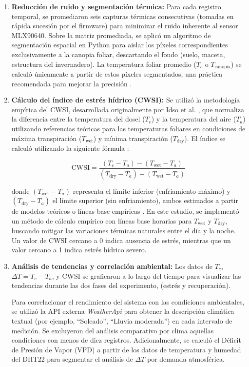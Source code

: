 \begin{enumerate}
    \item \textbf{Reducción de ruido y segmentación térmica:} 
    Para cada registro temporal, se promediaron seis capturas térmicas consecutivas (tomadas en rápida sucesión por el firmware) para minimizar el ruido inherente al sensor MLX90640. 
    Sobre la matriz promediada, se aplicó un algoritmo de segmentación espacial en Python para aislar los píxeles correspondientes exclusivamente a la canopia foliar, descartando el fondo (suelo, maceta, estructura del invernadero). 
    La temperatura foliar promedio ($T_c$ o $T_{\text{canopia}}$) se calculó únicamente a partir de estos píxeles segmentados, una práctica recomendada para mejorar la precisión .

    \item \textbf{Cálculo del índice de estrés hídrico (CWSI):} 
    Se utilizó la metodología empírica del CWSI, desarrollada originalmente por Idso et al. , que normaliza la diferencia entre la temperatura del dosel ($T_c$) y la temperatura del aire ($T_a$) utilizando referencias teóricas para las temperaturas foliares en condiciones de máxima transpiración ($T_{\text{wet}}$) y mínima transpiración ($T_{\text{dry}}$). 
    El índice se calculó utilizando la siguiente fórmula :

    \[
    \text{CWSI} = \frac{(T_c - T_a) - (T_{\text{wet}} - T_a)}{(T_{\text{dry}} - T_a) - (T_{\text{wet}} - T_a)}
    \]

    donde $(T_{\text{wet}} - T_a)$ representa el límite inferior (enfriamiento máximo) y $(T_{\text{dry}} - T_a)$ el límite superior (sin enfriamiento), ambos estimados a partir de modelos teóricos o líneas base empíricas . 
    En este estudio, se implementó un método de cálculo empírico con líneas base horarias para $T_{\text{wet}}$ y $T_{\text{dry}}$, buscando mitigar las variaciones térmicas naturales entre el día y la noche. 
    Un valor de CWSI cercano a 0 indica ausencia de estrés, mientras que un valor cercano a 1 indica estrés hídrico severo.

    \item \textbf{Análisis de tendencias y correlación ambiental:} 
    Los datos de $T_c$, $\Delta T = T_c - T_a$, y CWSI se graficaron a lo largo del tiempo para visualizar las tendencias durante las dos fases del experimento, (estrés y recuperación). 

    Para correlacionar el rendimiento del sistema con las condiciones ambientales, se utilizó la API externa \textit{WeatherApi} para obtener la descripción climática textual (por ejemplo, ``Soleado'', ``Lluvia moderada'') en cada intervalo de medición. 
    Se excluyeron del análisis comparativo por clima aquellas condiciones con menos de diez registros. 
    Adicionalmente, se calculó el Déficit de Presión de Vapor (VPD) a partir de los datos de temperatura y humedad del DHT22 para segmentar el análisis de $\Delta T$ por demanda atmosférica.
\end{enumerate}

